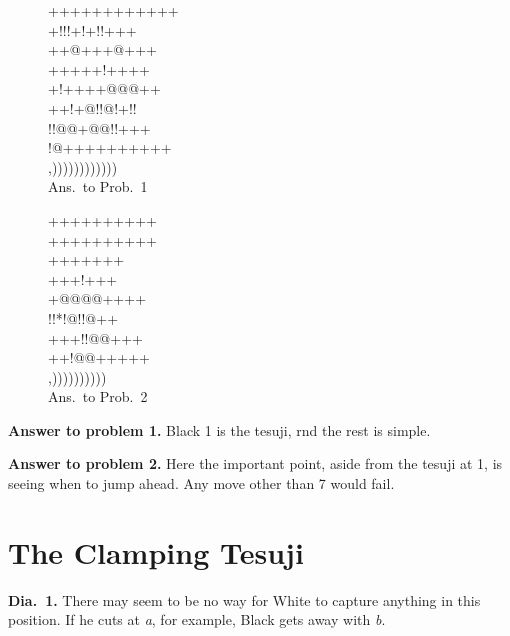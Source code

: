 \documentclass[mcrownvopaper,10pt,twopage,onecolumn,final]{memoir}
\begin{document}
\begin{figure}[ht]
    \begin{minipage}[c]{0.57\linewidth}
        \centering    
        {\gnos%
        ++++++++++++\\
        +!!!+!+!!+++\\
        ++@+++{\gnosb{}}@+++\\
        +++++{\gnosb{}}!{\gnosw{}}++++\\
        +!++++{\gnosw{}}@@@++\\
        ++!+@!!@!+!!\\
        !!@@+@@!!+++\\
        !@++++++++++\\
        ,))))))))))))\\
        }
        Ans.\ to Prob.\ 1
    \end{minipage}%
    \begin{minipage}[c]{0.43\linewidth}
        \centering    
        {\gnos%
        ++++++++++\\
        ++++++++++\\
        ++{\gnosb{}}+{\gnosb{}}++++\\
        +++{\gnosw{}}!{\gnosb{}}+++\\
        +@@@@{\gnosw{}}++++\\
        !!*!@!!@++\\
        +++!!@@+++\\
        ++!@@+++++\\
        ,))))))))))\\
        }
        Ans.\ to Prob.\ 2
    \end{minipage}
\end{figure}

\noindent
\textbf{Answer to problem 1.} Black 1 is the tesuji, rnd the rest is simple.

\noindent
\textbf{Answer to problem 2.} Here the important point, aside from the tesuji at
1, is seeing when to jump ahead. Any move other than 7 would fail.

\section{The Clamping Tesuji}
\textbf{Dia.\ 1.} There may seem to be no way for White to capture anything in
this position. If he cuts at \textit{a}, for example, Black gets away with \textit{b}.
\end{document}
